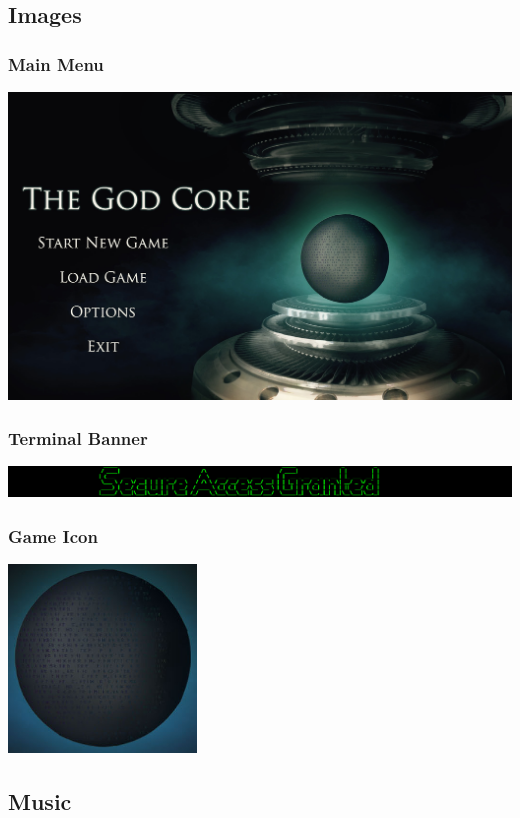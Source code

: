 \documentclass{article}
\begin{document}
\small{}
\subsection{Images} \label{subsec:images}

\subsubsection{Main Menu}
	\includegraphics[width=18cm]{../Resources/Images/Main}
\subsubsection{Terminal Banner}
	\includegraphics[width=18cm]{../Resources/Images/banner}
\subsubsection{Game Icon}
	\includegraphics[width=5cm]{../Resources/Images/Core}
	
\subsection{Music}
\end{document}
